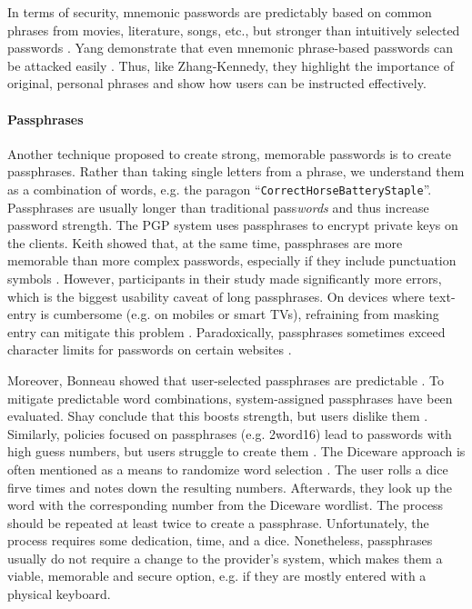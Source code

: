 	In terms of security, mnemonic passwords are predictably based on common phrases from movies, literature, songs, etc., but stronger than intuitively selected passwords \cite{Kuo2006HumanSelectionMnemonic}. Yang \etal demonstrate that even mnemonic phrase-based passwords can be attacked easily \cite{Yang2016MnemonicSentenceBased}. Thus, like Zhang-Kennedy, they highlight the importance of original, personal phrases and show how users can be instructed effectively.
		
	
	\paragraph{Passphrases}\label{sec:rw:passphrases}
	Another technique proposed to create strong, memorable passwords is to create passphrases. Rather than taking single letters from a phrase, we understand them as a combination of words, e.g. the paragon ``\texttt{CorrectHorseBatteryStaple}''. Passphrases are usually longer than traditional pass\textit{words} and thus increase password strength. The PGP system uses passphrases to encrypt private keys on the clients. Keith \etal showed that, at the same time, passphrases are more memorable than more complex passwords, especially if they include punctuation symbols \cite{Keith2009PassphraseDesign}. However, participants in their study made significantly more errors, which is the biggest usability caveat of long passphrases. On devices where text-entry is cumbersome (e.g. on mobiles or smart TVs), refraining from masking entry can mitigate this problem \cite{Melicher2016UsabilityMobileTextPasswords}. Paradoxically, passphrases sometimes exceed character limits for passwords on certain websites \cite{Carnavalet2014AnalyzingPWStrengthMeters}. 
	
	Moreover, Bonneau showed that user-selected passphrases are predictable \cite{Bonneau2012LinguisticProperties}. To mitigate predictable word combinations, system-assigned passphrases have been evaluated. Shay \etal conclude that this boosts strength, but users dislike them \cite{Shay2012CorrectHorseBatteryStaple}. Similarly, policies focused on passphrases (e.g. 2word16) lead to passwords with high guess numbers, but users struggle to create them \cite{Shay2014CanLongPasswordsBeSecureAndUsable}. The Diceware approach is often mentioned as a means to randomize word selection . The user rolls a dice firve times and notes down the resulting numbers. Afterwards, they look up the word with the corresponding number from the Diceware wordlist. The process should be repeated at least twice to create a passphrase. Unfortunately, the process requires some dedication, time, and a dice. Nonetheless, passphrases usually do not require a change to the provider's system, which makes them a viable, memorable and secure option, e.g. if they are mostly entered with a physical keyboard. 
	
